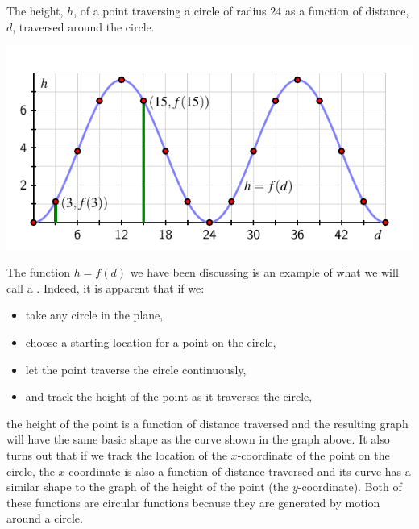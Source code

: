 \documentclass[nooutcomes, noauthor]{ximera}
\begin{document}
\begin{center}
The height, \(h\), of a point traversing a circle of radius \(24\) as a function of distance, \(d\), traversed around the circle.
\end{center}

\begin{image}
\includegraphics{traversing-first-example-graph.pdf}
\end{image}

The function \(h = f(d)\) we have been discussing is an example of what we will call a .  Indeed, it is apparent that if we:
\begin{itemize}[label=\textbullet]
\item
take any circle in the plane,%
\item
choose a starting location for a point on the circle,%
\item
let the point traverse the circle continuously,%
\item
and track the height of the point as it traverses the circle,%
\end{itemize}
the height of the point is a function of distance traversed and the resulting graph will have the same basic shape as the curve shown in the graph above.  It also turns out that if we track the location of the \(x\)-coordinate of the point on the circle, the \(x\)-coordinate is also a function of distance traversed and its curve has a similar shape to the graph of the height of the point (the \(y\)-coordinate).  Both of these functions are circular functions because they are generated by motion around a circle.
\end{document}
